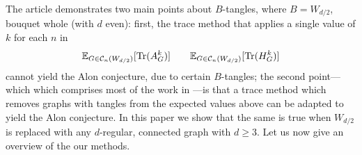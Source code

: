 \documentclass{memo-l}
\theoremstyle{plain}
\theoremstyle{definition}
\numberwithin{section}{chapter}
\numberwithin{equation}{chapter}
\DeclareMathOperator{\Tr}{Tr}
\theoremstyle{plain}
\theoremstyle{definition}
\newcommand\EE{\mathbb{E}}
\newcommand\cC{\mathcal{C}}
\begin{document}
The article \cite{friedman_alon} demonstrates two main points about
$B$-tangles, where $B=W_{d/2}$, 
\gls{bouquet whole}
(with $d$ even): first,
the trace method that applies a single value of $k$ for each $n$
in
$$
\EE_{G \in \cC_n(W_{d/2})}[ \Tr(A_G^k) ] 
\quad\mbox\quad
\EE_{G \in \cC_n(W_{d/2})}[ \Tr(H_G^k) ] 
$$
cannot yield the Alon conjecture, due to certain $B$-tangles;
the second point---which
which comprises most of the work in \cite{friedman_alon}---is
that a trace method which removes graphs with tangles from the expected
values above can be adapted to yield the Alon conjecture.
In this paper we show that the same is true when $W_{d/2}$ is replaced
with any $d$-regular, connected graph with $d\ge 3$.
Let us now give an overview of the our methods.
%
%
% 
% 
% 
\end{document}
